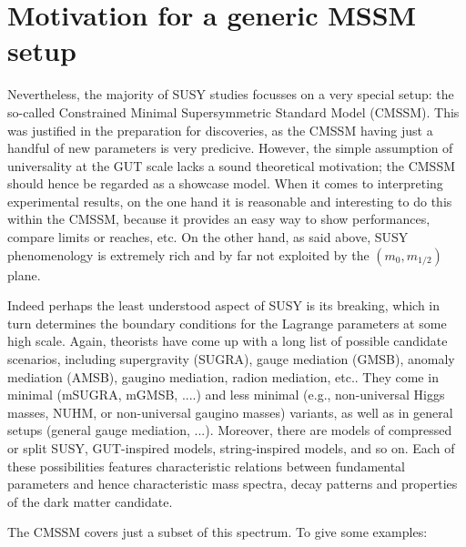 \section{Motivation for a generic MSSM setup}
\label{sec:motivation}


Nevertheless, the majority of SUSY studies focusses on a very special 
setup: the so-called Constrained Minimal Supersymmetric Standard Model (CMSSM). 
This was justified in the preparation for discoveries, as the CMSSM 
having just a handful of new parameters is very predicive. However, 
the simple assumption of universality at the GUT scale lacks a sound 
theoretical motivation; the CMSSM should hence be regarded as a showcase 
model. When it comes to interpreting experimental results, on the 
one hand it is reasonable and interesting to do this within the CMSSM, 
because it provides an easy way to show performances, compare limits 
or reaches, etc. On the other hand, as said above, SUSY phenomenology 
is extremely rich and by far not exploited by the $(m_0,m_{1/2})$ plane.

Indeed perhaps the least understood aspect of SUSY is its breaking, 
which in turn determines the boundary conditions for the Lagrange 
parameters at some high scale. Again, theorists have come up with a 
long list of possible candidate scenarios, including 
supergravity (SUGRA), 
gauge mediation (GMSB), 
anomaly mediation (AMSB), 
gaugino mediation, radion mediation, etc.. 
They come in minimal (mSUGRA, mGMSB, ....) and  
less minimal (e.g., non-universal Higgs masses, NUHM,  
or non-universal gaugino masses) variants, as well as in general setups 
(general gauge mediation, ...). 
Moreover, there are models of compressed or split SUSY, 
GUT-inspired models, string-inspired models, and so on. 
Each of these possibilities features characteristic relations between 
fundamental parameters and hence characteristic mass spectra, decay 
patterns and properties of the dark matter candidate. 

The CMSSM covers just a subset of this spectrum. To give some 
examples:

